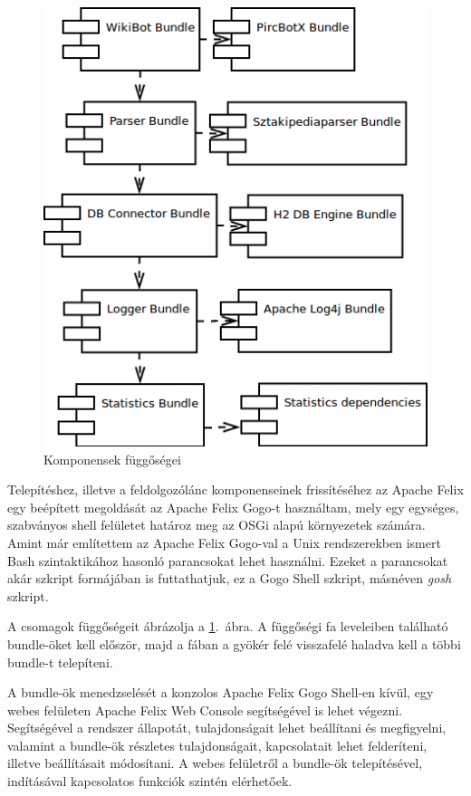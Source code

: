 \begin{figure}[htp]
\centering
\includegraphics[scale=0.5]{img/deploymentdependency}
\caption{Komponensek függőségei}
\label{fig:deploymentdependency}
\end{figure}

Telepítéshez, illetve a feldolgozólánc komponenseinek frissítéséhez az Apache Felix egy beépített megoldását az Apache Felix Gogo-t használtam, mely egy egységes, szabványos shell felületet határoz meg az OSGi alapú környezetek számára. Amint már említettem az Apache Felix Gogo-val a Unix rendszerekben ismert Bash szintaktikához hasonló parancsokat lehet használni. Ezeket a parancsokat akár szkript formájában is futtathatjuk, ez a Gogo Shell szkript, másnéven \textit{gosh} szkript.

A csomagok függőségeit ábrázolja a \ref{fig:deploymentdependency}.~ábra. A függőségi fa leveleiben található bundle-öket kell először, majd a fában a gyökér felé visszafelé haladva kell a többi bundle-t telepíteni.

A bundle-ök menedzselését a konzolos Apache Felix Gogo Shell-en kívül, egy webes felületen Apache Felix Web Console segítségével is lehet végezni. Segítségével a rendszer állapotát, tulajdonságait lehet beállítani és megfigyelni, valamint a bundle-ök részletes tulajdonságait, kapcsolatait lehet felderíteni, illetve beállításait módosítani. A webes felületről a bundle-ök telepítésével, indításával kapcsolatos funkciók szintén elérhetőek.

